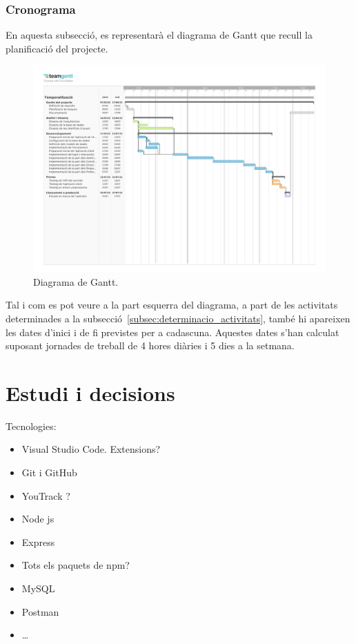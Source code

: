 \documentclass[a4paper,12pt]{ThesisStyle}
\begin{document}
\subsection{Cronograma}
\label{subsec:cronograma}

En aquesta subsecció, es representarà el diagrama de Gantt que recull la planificació del projecte.

\begin{figure}[H]
  \centering
  \includegraphics[width=1.3\textwidth, angle=90]{assets/planification_figs/ganttDiagram.pdf}
  \caption{\label{img:diagrama_gantt}Diagrama de Gantt.}
\end{figure}

Tal i com es pot veure a la part esquerra del diagrama, a part de les activitats determinades a la subsecció~\ref{subsec:determinacio_activitats}, també hi apareixen les dates d'inici i de fi previstes per a cadascuna. Aquestes dates s'han calculat suposant jornades de treball de 4 hores diàries i 5 dies a la setmana.


\chapter{Estudi i decisions}
\label{cap:estudi}

Tecnologies:
\begin{itemize}
  \item Visual Studio Code. Extensions?
  \item Git i GitHub
  \item YouTrack ?
  \item Node js
  \item Express
  \item Tots els paquets de npm?
  \item MySQL
  \item Postman
  \item \ldots
\end{itemize}
\end{document}
